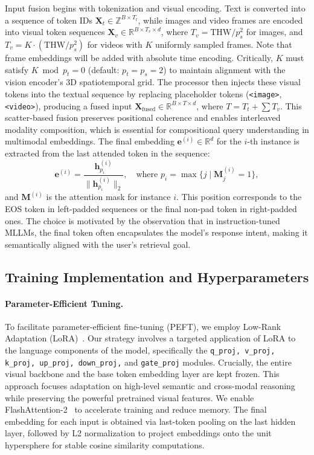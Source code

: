 Input fusion begins with tokenization and visual encoding. Text is converted into a sequence of token IDs $\mathbf{X}_t \in \mathbb{Z}^{B \times T_t}$, while images and video frames are encoded into visual token sequences $\mathbf{X}_v \in \mathbb{R}^{B \times T_v \times d}$, where $T_v = \text{THW} / p_{s}^2$ for images, and $T_v = K \cdot (\text{THW} / p_{s}^2)$ for videos with $K$ uniformly sampled frames. Note that frame embeddings will be added with absolute time encoding. Critically, $K$ must satisfy $K \bmod p_{t} = 0$ (default: $p_{t} = p_{s} = 2$) to maintain alignment with the vision encoder’s 3D spatiotemporal grid. The processor then injects these visual tokens into the textual sequence by replacing placeholder tokens (\texttt{<image>}, \texttt{<video>}), producing a fused input $\mathbf{X}_{\text{fused}} \in \mathbb{R}^{B \times T \times d}$, where $T = T_t + \sum T_v$. This scatter-based fusion preserves positional coherence and enables interleaved modality composition, which is essential for compositional query understanding in multimodal embeddings.
The final embedding $\mathbf{e}^{(i)} \in \mathbb{R}^d$ for the $i$-th instance is extracted from the last attended token in the sequence:
\begin{equation*}
    \mathbf{e}^{(i)} = \frac{\mathbf{h}^{(i)}_{p_i}}{\|\mathbf{h}^{(i)}_{p_i}\|_2}, \quad \text{where } p_i = \max \{ j \mid \mathbf{M}^{(i)}_j = 1 \},
\end{equation*}
and $\mathbf{M}^{(i)}$ is the attention mask for instance $i$. This position corresponds to the EOS token in left-padded sequences or the final non-pad token in right-padded ones. The choice is motivated by the observation that in instruction-tuned MLLMs, the final token often encapsulates the model’s response intent, making it semantically aligned with the user’s retrieval goal.


\subsection{Training Implementation and Hyperparameters}\label{gve:app:hyperparameters}

\paragraph{Parameter-Efficient Tuning.}
To facilitate parameter-efficient fine-tuning (PEFT), we employ Low-Rank Adaptation (LoRA)~\cite{hu2021lora}. Our strategy involves a targeted application of LoRA to the language components of the model, specifically the \texttt{q\_proj, v\_proj, k\_proj, up\_proj, down\_proj,} and \texttt{gate\_proj} modules. Crucially, the entire visual backbone and the base token embedding layer are kept frozen. This approach focuses adaptation on high-level semantic and cross-modal reasoning while preserving the powerful pretrained visual features. We enable FlashAttention-2~\cite{dao2023flashattention} to accelerate training and reduce memory. The final embedding for each input is obtained via last-token pooling on the last hidden layer, followed by L2 normalization to project embeddings onto the unit hypersphere for stable cosine similarity computations.

